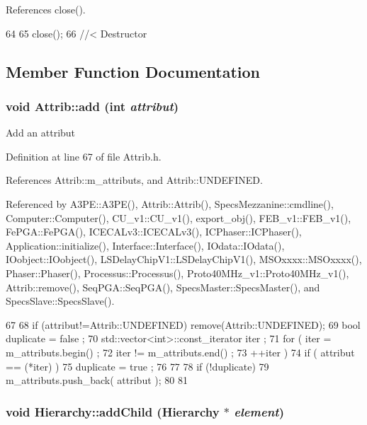 References close().


\begin{DoxyCode}
64                               {
65     close();
66   } //< Destructor
\end{DoxyCode}


\subsection{Member Function Documentation}
\hypertarget{classAttrib_a235f773af19c900264a190b00a3b4ad7}{
\subsubsection[{add}]{\setlength{\rightskip}{0pt plus 5cm}void Attrib::add (int {\em attribut})}}
\label{classAttrib_a235f773af19c900264a190b00a3b4ad7}
Add an attribut 

Definition at line 67 of file Attrib.h.

References Attrib::m\_\-attributs, and Attrib::UNDEFINED.

Referenced by A3PE::A3PE(), Attrib::Attrib(), SpecsMezzanine::cmdline(), Computer::Computer(), CU\_\-v1::CU\_\-v1(), export\_\-obj(), FEB\_\-v1::FEB\_\-v1(), FePGA::FePGA(), ICECALv3::ICECALv3(), ICPhaser::ICPhaser(), Application::initialize(), Interface::Interface(), IOdata::IOdata(), IOobject::IOobject(), LSDelayChipV1::LSDelayChipV1(), MSOxxxx::MSOxxxx(), Phaser::Phaser(), Processus::Processus(), Proto40MHz\_\-v1::Proto40MHz\_\-v1(), Attrib::remove(), SeqPGA::SeqPGA(), SpecsMaster::SpecsMaster(), and SpecsSlave::SpecsSlave().


\begin{DoxyCode}
67                             {
68     if (attribut!=Attrib::UNDEFINED) remove(Attrib::UNDEFINED);
69     bool duplicate = false ;
70     std::vector<int>::const_iterator iter ;
71     for ( iter  = m_attributs.begin() ;
72           iter != m_attributs.end()   ;
73           ++iter ) {
74       if ( attribut == (*iter) ) {
75         duplicate = true ;
76       }
77     }
78     if (!duplicate) {
79       m_attributs.push_back( attribut );
80     }
81   }
\end{DoxyCode}
\hypertarget{classHierarchy_ad677774ff38fcb257c04a3a10d471fac}{
\subsubsection[{addChild}]{\setlength{\rightskip}{0pt plus 5cm}void Hierarchy::addChild ({\bf Hierarchy} $\ast$ {\em element})}}
\label{classHierarchy_ad677774ff38fcb257c04a3a10d471fac}


